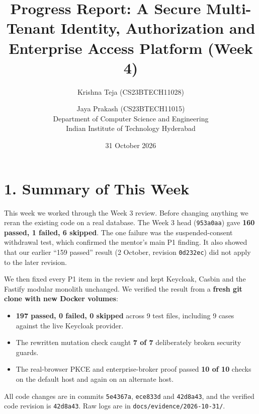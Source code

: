 \documentclass{article}
\title{\textbf{Progress Report: A Secure Multi-Tenant Identity, Authorization and Enterprise Access Platform (Week 4)}}
\author{Krishna Teja (CS23BTECH11028) \and Jaya Prakash (CS23BTECH11015) \\ Department of Computer Science and Engineering \\ Indian Institute of Technology Hyderabad}
\date{31 October 2026}
\begin{document}
\maketitle

\section*{1. Summary of This Week}
This week we worked through the Week 3 review. Before changing anything we reran the existing code on a real database. The Week 3 head (\texttt{953a0aa}) gave \textbf{160 passed, 1 failed, 6 skipped}. The one failure was the suspended-consent withdrawal test, which confirmed the mentor's main P1 finding. It also showed that our earlier ``159 passed'' result (2 October, revision \texttt{0d232ec}) did not apply to the later revision.

We then fixed every P1 item in the review and kept Keycloak, Casbin and the Fastify modular monolith unchanged. We verified the result from a \textbf{fresh git clone with new Docker volumes}:

\begin{itemize}
    \item \textbf{197 passed, 0 failed, 0 skipped} across 9 test files, including 9 cases against the live Keycloak provider.
    \item The rewritten mutation check caught \textbf{7 of 7} deliberately broken security guards.
    \item The real-browser PKCE and enterprise-broker proof passed \textbf{10 of 10} checks on the default host and again on an alternate host.
\end{itemize}

All code changes are in commits \texttt{5e4367a}, \texttt{ece833d} and \texttt{42d8a43}, and the verified code revision is \texttt{42d8a43}. Raw logs are in \texttt{docs/evidence/2026-10-31/}.
\end{document}
